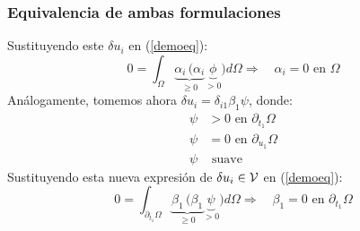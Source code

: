 \documentclass[handout]{beamer}
\begin{document}
\begin{frame}
\frametitle{Equivalencia de ambas formulaciones}
Sustituyendo este $\delta u_i$ en (\ref{demoeq}):
\begin{equation}
0=\int_{\Omega} \underbrace{\alpha_i \, (\alpha_i}_{\geq 0}
\underbrace{ \phi}_{>0}) d\Omega 
\Rightarrow \quad \alpha_i=0 \textrm{ en } \Omega
\end{equation}
Análogamente, tomemos ahora $\delta u_i=\delta_{i1} \beta_1 \psi$, donde:
\begin{align*}
\psi&>0 \textrm{ en } \partial_{t_1}\Omega \\
\psi&=0 \textrm{ en } \partial_{u_1} \Omega \\
\psi& \textrm{ suave}
\end{align*}
Sustituyendo esta nueva expresión de $\delta u_i \in {\cal V}$ en
(\ref{demoeq}):
\begin{equation}
0=\int_{\partial_{t_1} \Omega} \underbrace{\beta_1 \, (\beta_1}_{\geq 0}
\underbrace{ \psi}_{>0}) d\Omega 
\Rightarrow \quad \beta_1=0 \textrm{ en } \partial_{t_1} \Omega
\end{equation}
\end{frame}
\end{document}

